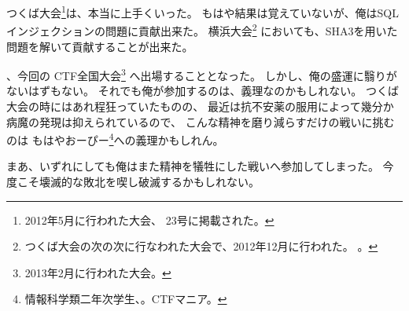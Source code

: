 つくば大会\footnote{2012年5月に行われた大会、{\WORD} 23号に掲載された。}は、本当に上手くいった。
もはや結果は覚えていないが、俺はSQLインジェクションの問題に貢献出来た。
横浜大会\footnote{%
つくば大会の次の次に行なわれた大会で、2012年12月に行われた。
。}%
においても、SHA3を用いた問題を解いて貢献することが出来た。

、今回の{\SECCON} CTF全国大会\footnote{2013年2月に行われた大会。}%
へ出場することとなった。
しかし、俺の盛運に翳りがないはずもない。
それでも俺が参加するのは、義理なのかもしれない。
つくば大会の時にはあれ程狂っていたものの、
最近は抗不安薬の服用によって幾分か病魔の発現は抑えられているので、
こんな精神を磨り減らすだけの戦いに挑むのは
もはやおーぴー\footnote{情報科学類二年次学生、。CTFマニア。}への義理かもしれん。

まあ、いずれにしても俺はまた精神を犠牲にした戦いへ参加してしまった。
今度こそ壊滅的な敗北を喫し破滅するかもしれない。

